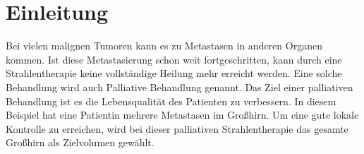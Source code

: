 \section{Einleitung}
\label{sec:Einleitung}

Bei vielen malignen Tumoren kann es zu Metastasen in anderen Organen kommen. Ist
diese Metastasierung schon weit fortgeschritten, kann durch eine Strahlentherapie
keine vollständige Heilung mehr erreicht werden. Eine solche Behandlung wird auch
Palliative Behandlung genannt. Das Ziel einer palliativen Behandlung ist es
die Lebensqualität des Patienten zu verbessern. In diesem Beispiel hat eine Patientin
mehrere Metastasen im Großhirn. Um eine gute lokale Kontrolle zu erreichen, wird bei dieser
palliativen Strahlentherapie das gesamte Großhirn als Zielvolumen gewählt.


%
%
%
%
